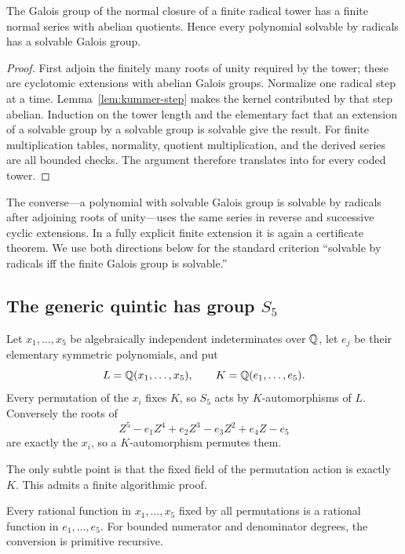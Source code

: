 \begin{theorem}\label{thm:radicals-solvable}
The Galois group of the normal closure of a finite radical tower has a finite
normal series with abelian quotients.  Hence every polynomial solvable by
radicals has a solvable Galois group.
\end{theorem}

\begin{proof}
First adjoin the finitely many roots of unity required by the tower; these are
cyclotomic extensions with abelian Galois groups.  Normalize one radical step at
a time.  Lemma~\ref{lem:kummer-step} makes the kernel contributed by that step
abelian.  Induction on the tower length and the elementary fact that an
extension of a solvable group by a solvable group is solvable give the result.
For finite multiplication tables, normality, quotient multiplication, and the
derived series are all bounded checks.  The argument therefore translates into
\ipra{} for every coded tower.
\end{proof}

The converse---a polynomial with solvable Galois group is solvable by
radicals after adjoining roots of unity---uses the same series in reverse and
successive cyclic extensions.  In a fully explicit finite extension it is
again a certificate theorem.  We use both directions below for the standard
criterion ``solvable by radicals iff the finite Galois group is solvable.''

\subsection{The generic quintic has group \(S_5\)}

Let \(x_1,\ldots,x_5\) be algebraically independent indeterminates over
\(\mathbb Q\), let \(e_j\) be their elementary symmetric polynomials, and put
\[
 L=\mathbb Q(x_1,\ldots,x_5),
 \qquad K=\mathbb Q(e_1,\ldots,e_5).
\]
Every permutation of the \(x_i\) fixes \(K\), so \(S_5\) acts by
\(K\)-automorphisms of \(L\).  Conversely the roots of
\begin{equation}\label{eq:generic-quintic}
 Z^5-e_1Z^4+e_2Z^3-e_3Z^2+e_4Z-e_5
\end{equation}
are exactly the \(x_i\), so a \(K\)-automorphism permutes them.

The only subtle point is that the fixed field of the permutation action is
exactly \(K\).  This admits a finite algorithmic proof.

\begin{lemma}
\label{lem:symmetric-rational}
Every rational function in \(x_1,\ldots,x_5\) fixed by all permutations is a
rational function in \(e_1,\ldots,e_5\).  For bounded numerator and denominator
degrees, the conversion is primitive recursive.
\end{lemma}

